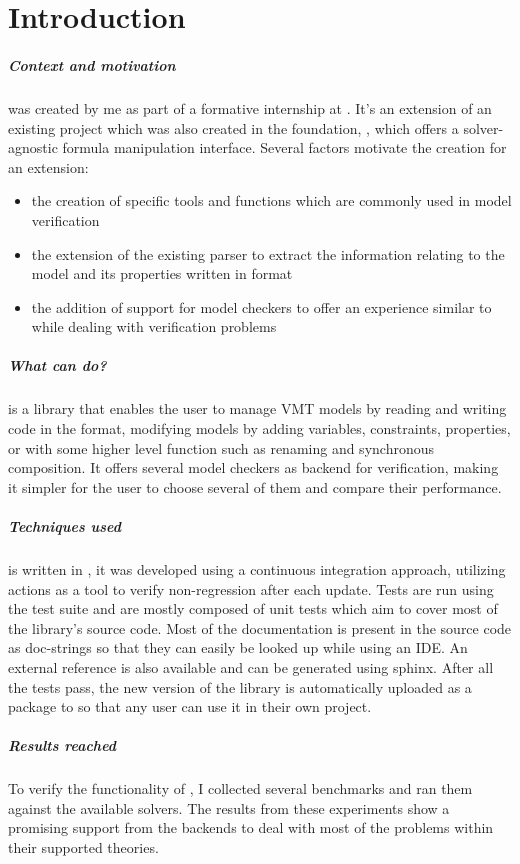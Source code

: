 \chapter*{Introduction}
\label{introduction}

\paragraph*{Context and motivation}
\pyvmt{} was created by me as part of a formative internship at \FBK{}. It's an extension of an existing project which was also created in the foundation, \pysmt{}, which offers a solver-agnostic formula manipulation interface.
Several factors motivate the creation for an extension:
\begin{itemize}
  \item the creation of specific tools and functions which are commonly used in model verification
  \item the extension of the existing \smtlib{} parser to extract the information relating to the model and its properties written in \vmtlib{} format
  \item the addition of support for model checkers to offer an experience similar to \pysmt{} while dealing with verification problems
\end{itemize}

\paragraph*{What can \pyvmt{} do?}
\pyvmt{} is a \python{} library that enables the user to manage VMT models by reading and writing code in the \vmtlib{} format, modifying models by adding variables, constraints, properties, or with some higher level function such as renaming and synchronous composition. It offers several model checkers as backend for verification, making it simpler for the user to choose several of them and compare their performance.

\paragraph*{Techniques used}
\pyvmt{} is written in \python{}, it was developed using a continuous integration approach, utilizing \github{} actions as a tool to verify non-regression after each update.
Tests are run using the \pytest{} test suite and are mostly composed of unit tests which aim to cover most of the library's source code.
Most of the documentation is present in the source code as doc-strings so that they can easily be looked up while using an IDE. An external reference is also available and can be generated using sphinx.
After all the tests pass, the new version of the library is automatically uploaded as a package to \pypi{} so that any user can use it in their own project.

\paragraph*{Results reached}
To verify the functionality of \pyvmt{}, I collected several benchmarks and ran them against the available solvers. The results from these experiments show a promising support from the backends to deal with most of the problems within their supported theories.

